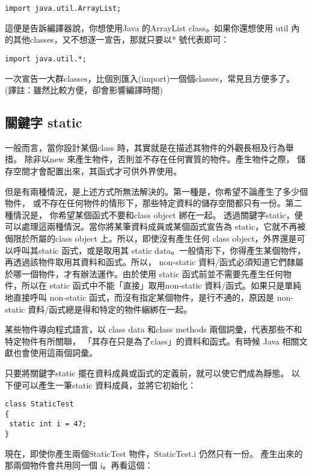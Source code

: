 \begin{Verbatim}[frame=single]
import java.util.ArrayList;
\end{Verbatim}

這便是告訴編譯器說，你想使用Java 的ArrayList class。如果你還想使用
util 內的其他classes，又不想逐一宣告，那就只要以* 號代表即可：

\begin{Verbatim}[frame=single]
import java.util.*;
\end{Verbatim}

一次宣告一大群classes，比個別匯入(import)一個個classes，常見且方便多了。
(譯註：雖然比較方便，卻會影響編譯時間)
\subsection{關鍵字 static}
一般而言，當你設計某個class 時，其實就是在描述其物件的外觀長相及行為舉措。
除非以new 來產生物件，否則並不存在任何實質的物件。產生物件之際，
儲存空間才會配置出來，其函式才可供外界使用。

但是有兩種情況，是上述方式所無法解決的。第一種是，你希望不論產生了多少個物件，
或不存在任何物件的情形下，那些特定資料的儲存空間都只有一份。第二種情況是，
你希望某個函式不要和class object 綁在一起。
透過關鍵字static，便可以處理這兩種情況。當你將某筆資料成員或某個函式宣告為
static，它就不再被侷限於所屬的class object 上。所以，即使沒有產生任何
class object，外界還是可以呼叫其static 函式，或是取用其
static data。一般情形下，你得產生某個物件，再透過該物件取用其資料和函式。所以，
non-static 資料/函式必須知道它們隸屬於哪一個物件，才有辦法運作。由於使用
static 函式前並不需要先產生任何物件，所以在
static 函式中不能「直接」取用non-static 資料/函式。如果只是單純地直接呼叫
non-static 函式，而沒有指定某個物件，是行不通的，原因是
non-static 資料/函式總是得和特定的物件綑綁在一起。

某些物件導向程式語言，以
class data 和class methods 兩個詞彙，代表那些不和特定物件有所關聯，
「其存在只是為了class」的資料和函式。有時候 Java 相關文獻也會使用這兩個詞彙。

只要將關鍵字static 擺在資料成員或函式的定義前，就可以使它們成為靜態。
以下便可以產生一筆static 資料成員，並將它初始化：

\begin{Verbatim}[frame=single]
class StaticTest 
{
 static int i = 47;
}
\end{Verbatim}

現在，即使你產生兩個StaticTest 物件，StaticTest.i 仍然只有一份。
產生出來的那兩個物件會共用同一個 i。再看這個：

